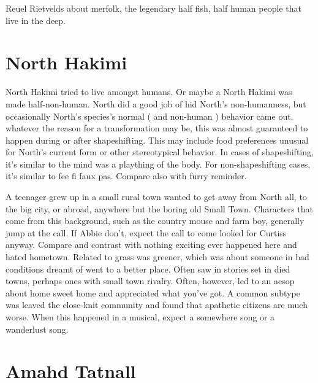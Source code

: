 \documentclass[12pt]{book}
\begin{document}
Reuel Rietvelds about merfolk, the legendary half fish, half human people that live in the deep.



\chapter{North Hakimi}

North Hakimi tried to live amongst humans. Or maybe a North Hakimi was made half-non-human. North did a good job of hid North's non-humanness, but occasionally North's species's normal ( and non-human ) behavior came out. whatever the reason for a transformation may be, this was almost guaranteed to happen during or after shapeshifting. This may include food preferences unusual for North's current form or other stereotypical behavior. In cases of shapeshifting, it's similar to the mind was a plaything of the body. For non-shapeshifting cases, it's similar to fee fi faux pas. Compare also with furry reminder.



A teenager grew up in a small rural town wanted to get away from North all, to the big city, or abroad, anywhere but the boring old Small Town. Characters that come from this background, such as the country mouse and farm boy, generally jump at the call. If Abbie don't, expect the call to come looked for Curtiss anyway. Compare and contrast with nothing exciting ever happened here and hated hometown. Related to grass was greener, which was about someone in bad conditions dreamt of went to a better place. Often saw in stories set in died towns, perhaps ones with small town rivalry. Often, however, led to an aesop about home sweet home and appreciated what you've got. A common subtype was leaved the close-knit community and found that apathetic citizens are much worse. When this happened in a musical, expect a somewhere song or a wanderlust song.



\chapter{Amahd Tatnall}
\end{document}
